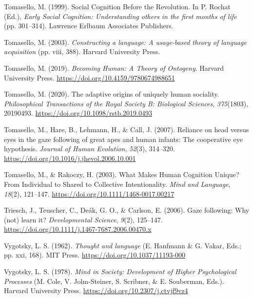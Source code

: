 \documentclass[
]{scrbook}
\newlength{\cslhangindent}
\newenvironment{CSLReferences}[2] %
 {\begin{list}{}{%
  \setlength{\itemindent}{0pt}
  \setlength{\leftmargin}{0pt}
  \setlength{\parsep}{0pt}
  \ifodd #1
   \setlength{\leftmargin}{\cslhangindent}
   \setlength{\itemindent}{-1\cslhangindent}
  \fi
  \setlength{\itemsep}{#2\baselineskip}}}
 {\end{list}}
\begin{document}
\begin{CSLReferences}{1}{0}
Tomasello, M. (1999). Social {Cognition Before} the {Revolution}. In P. Rochat (Ed.), \emph{Early {Social Cognition}: {Understanding} others in the first months of life} (pp. 301--314). Lawrence Erlbaum Associates Publishers.

Tomasello, M. (2003). \emph{Constructing a language: {A} usage-based theory of language acquisition} (pp. viii, 388). Harvard University Press.

Tomasello, M. (2019). \emph{Becoming {Human}: {A Theory} of {Ontogeny}}. Harvard University Press. \url{https://doi.org/10.4159/9780674988651}

Tomasello, M. (2020). The adaptive origins of uniquely human sociality. \emph{Philosophical Transactions of the Royal Society B: Biological Sciences}, \emph{375}(1803), 20190493. \url{https://doi.org/10.1098/rstb.2019.0493}

Tomasello, M., Hare, B., Lehmann, H., \& Call, J. (2007). Reliance on head versus eyes in the gaze following of great apes and human infants: The cooperative eye hypothesis. \emph{Journal of Human Evolution}, \emph{52}(3), 314--320. \url{https://doi.org/10.1016/j.jhevol.2006.10.001}

Tomasello, M., \& Rakoczy, H. (2003). What {Makes Human Cognition Unique}? {From Individual} to {Shared} to {Collective Intentionality}. \emph{Mind and Language}, \emph{18}(2), 121--147. \url{https://doi.org/10.1111/1468-0017.00217}

Triesch, J., Teuscher, C., Deák, G. O., \& Carlson, E. (2006). Gaze following: Why (not) learn it? \emph{Developmental Science}, \emph{9}(2), 125--147. \url{https://doi.org/10.1111/j.1467-7687.2006.00470.x}

Vygotsky, L. S. (1962). \emph{Thought and language} (E. Hanfmann \& G. Vakar, Eds.; pp. xxi, 168). MIT Press. \url{https://doi.org/10.1037/11193-000}

Vygotsky, L. S. (1978). \emph{Mind in {Society}: {Development} of {Higher Psychological Processes}} (M. Cole, V. Jolm-Steiner, S. Scribner, \& E. Souberman, Eds.). Harvard University Press. \url{https://doi.org/10.2307/j.ctvjf9vz4}


\end{CSLReferences}
\end{document}
